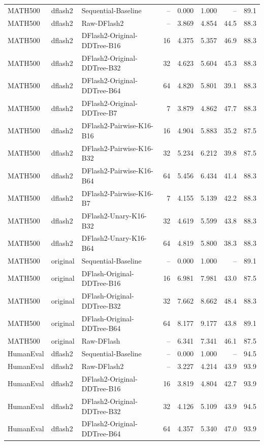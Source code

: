 \begin{longtable}{lllrrrrr}
MATH500 & dflash2 & Sequential-Baseline & -- & 0.000 & 1.000 & -- & 89.1 \\
MATH500 & dflash2 & Raw-DFlash2 & -- & 3.869 & 4.854 & 44.5 & 88.3 \\
MATH500 & dflash2 & DFlash2-Original-DDTree-B16 & 16 & 4.375 & 5.357 & 46.9 & 88.3 \\
MATH500 & dflash2 & DFlash2-Original-DDTree-B32 & 32 & 4.623 & 5.604 & 45.3 & 88.3 \\
MATH500 & dflash2 & DFlash2-Original-DDTree-B64 & 64 & 4.820 & 5.801 & 39.1 & 88.3 \\
MATH500 & dflash2 & DFlash2-Original-DDTree-B7 & 7 & 3.879 & 4.862 & 47.7 & 88.3 \\
MATH500 & dflash2 & DFlash2-Pairwise-K16-B16 & 16 & 4.904 & 5.883 & 35.2 & 87.5 \\
MATH500 & dflash2 & DFlash2-Pairwise-K16-B32 & 32 & 5.234 & 6.212 & 39.8 & 87.5 \\
MATH500 & dflash2 & DFlash2-Pairwise-K16-B64 & 64 & 5.456 & 6.434 & 41.4 & 88.3 \\
MATH500 & dflash2 & DFlash2-Pairwise-K16-B7 & 7 & 4.155 & 5.139 & 42.2 & 88.3 \\
MATH500 & dflash2 & DFlash2-Unary-K16-B32 & 32 & 4.619 & 5.599 & 43.8 & 88.3 \\
MATH500 & dflash2 & DFlash2-Unary-K16-B64 & 64 & 4.819 & 5.800 & 38.3 & 88.3 \\
MATH500 & original & Sequential-Baseline & -- & 0.000 & 1.000 & -- & 89.1 \\
MATH500 & original & DFlash-Original-DDTree-B16 & 16 & 6.981 & 7.981 & 43.0 & 87.5 \\
MATH500 & original & DFlash-Original-DDTree-B32 & 32 & 7.662 & 8.662 & 48.4 & 88.3 \\
MATH500 & original & DFlash-Original-DDTree-B64 & 64 & 8.177 & 9.177 & 43.8 & 89.1 \\
MATH500 & original & Raw-DFlash & -- & 6.341 & 7.341 & 46.1 & 87.5 \\
HumanEval & dflash2 & Sequential-Baseline & -- & 0.000 & 1.000 & -- & 94.5 \\
HumanEval & dflash2 & Raw-DFlash2 & -- & 3.227 & 4.214 & 43.9 & 93.9 \\
HumanEval & dflash2 & DFlash2-Original-DDTree-B16 & 16 & 3.819 & 4.804 & 42.7 & 93.9 \\
HumanEval & dflash2 & DFlash2-Original-DDTree-B32 & 32 & 4.126 & 5.109 & 43.9 & 94.5 \\
HumanEval & dflash2 & DFlash2-Original-DDTree-B64 & 64 & 4.357 & 5.340 & 47.0 & 93.9 \\

\end{longtable}
